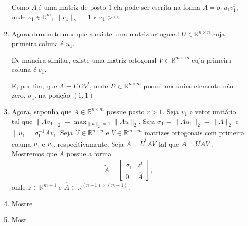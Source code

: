 \begin{questions}
\begin{solution}
\begin{enumerate}
                Como $A$ \'{e} uma matriz de posto $1$ ela pode ser escrita na forma $A = \sigma_1 u_1 v_1^t$, onde $v_1 \in \mathbb{R}^m$, $\| v_1 \|_2 = 1$ e $\sigma_1 > 0$.

            \item Agora demonstremos que a existe uma matriz ortogonal $U \in \mathbb{R}^{n \times n}$ cuja primeira coluna \'{e} $u_1$.

                De maneira similar, existe uma matriz ortogonal $V \in \mathbb{R}^{m \times m}$ cuja primeira coluna \'{e} $v_1$.

                E, por fim, que $A = U D V^t$, onde $D \in \mathbb{R}^{n \times m}$ possui um \'{u}nico elemento n\~{a}o zero, $\sigma_1$, na posi\c{c}\~{a}o $(1,1)$.

            \item Agora, suponha que $A \in \mathbb{R}^{n \times m}$ possue posto $r > 1$. Seja $v_1$ o vetor unit\'{a}rio tal que $\| A v_1 \|_2 = \max_{\| u \|_2 = 1} \| A u \|_2$. Seja $\sigma_1 = \| A u_1 \|_2 = \| A \|_2$ e $\| u_1 = \sigma_1^{-1} A v_1$. Seja $\tilde{U} \in \mathbb{R}^{n \times n}$ e $\tilde{V} \in \mathbb{R}^{m \times m}$ matrizes ortogonais com primeira coluna $u_1$ e $v_1$, respecitivamente. Seja $\tilde{A} = \tilde{U}^t A \tilde{V}$ tal que $A = \tilde{U} \tilde{A} \tilde{V}^t$. Mostremos que $\tilde{A}$ possue a forma
                \begin{align*}
                    \tilde{A} = \begin{bmatrix}
                        \sigma_1 & z^t \\
                        0 & \hat{A}
                    \end{bmatrix},
                \end{align*}
                onde $z \in \mathbb{R}^{m -1}$ e $\hat{A} \in \mathbb{R}^{(n - 1) \times (m - 1)}$.

            \item Mostre

            \item Most
        \end{enumerate}
    \end{solution}
\end{questions}
